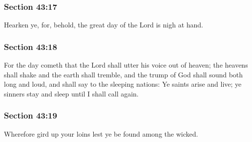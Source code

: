 	\subsubsection{Section 43:17} %
		\label{DC43-17}

		Hearken ye, for, behold, the great day of the Lord is nigh at hand.


	\subsubsection{Section 43:18} %
		\label{DC43-18}

		For the day cometh that the Lord shall utter his voice out of heaven; the heavens shall shake and the earth shall tremble, and the trump of God shall sound both long and loud, and shall say to the sleeping nations: Ye saints arise and live; ye sinners stay and sleep until I shall call again.


	\subsubsection{Section 43:19} %
		\label{DC43-19}

		Wherefore gird up your loins lest ye be found among the wicked.


